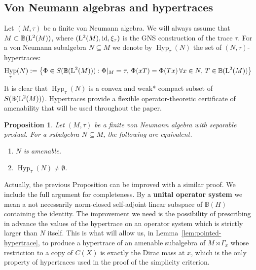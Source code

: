 \documentclass[12pt]{amsart} %
\theoremstyle{plain}
\newtheorem{proposition}[theorem]{Proposition}
\theoremstyle{definition}
\newcommand{\Lcal}{\mathbb{B}}
\newcommand{\id}{{\rm id}}
\DeclareMathOperator{\Hyp}{Hyp}
\begin{document}
\subsection{Von Neumann algebras and hypertraces}
\noindent Let $(M,\tau)$ be a finite von Neumann algebra. We will always assume that $M\subset\Lcal({\rm L}^2(M))$, where $({\rm L}^2(M),\id,\xi_\tau)$ is  the GNS construction of the trace $\tau$. For a von Neumann subalgebra $N\subseteq M$ we denote by $\Hyp_\tau(N)$ the set of $(N,\tau)$-hypertraces:
$$\Hyp_\tau(N):=\left\{\Phi\in S(\Lcal({\rm L}^2(M))):\Phi\vert_M=\tau,\,\Phi(xT)=\Phi(Tx)\,\forall x\in N,\,T\in\Lcal({\rm L}^2(M))\right\}$$
It is clear that $\Hyp_\tau(N)$ is a convex and weak* compact subset of $S(\Lcal({\rm L}^2(M)))$. Hypertraces provide a flexible operator-theoretic certificate of amenability that will be used throughout the paper.
\begin{proposition}\cite[Proposition 2.4]{THO25}\label{prop:amenability-hypertrace}
Let $(M,\tau)$ be a finite von Neumann algebra with separable predual. For a subalgebra $N\subseteq M$, the following are equivalent.
\begin{enumerate}
\item $N$ is amenable.
\item $\Hyp_\tau(N)\neq\emptyset$.
\end{enumerate}
\end{proposition}
\noindent Actually, the previous Proposition can be improved with a similar proof. We include the full argument for completeness.
\vspace{0.2cm}
\noindent By a \textbf{unital operator system} we mean a not necessarily norm-closed self-adjoint linear subspace of $\mathbb{B}(H)$ containing the identity.
\medskip
\noindent The improvement we need is the possibility of prescribing in advance the values of the hypertrace on an operator system which is strictly larger than $N$ itself. This is what will allow us, in Lemma~\ref{lem:pointed-hypertrace}, to produce a hypertrace of an amenable subalgebra of $M\rtimes\Gamma_x$ whose restriction to a copy of $C(X)$ is exactly the Dirac mass at $x$, which is the only property of hypertraces used in the proof of the simplicity criterion.
\medskip
\end{document}

